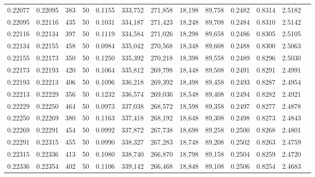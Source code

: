 \begin{tabular}{rrrrrrrrrrrrr}
0.22077 & 0.22095 &   383 &  50 &                                     0.1155 & 333,752 & 271,858 &  18,198 &  89,758 & 0.2482 & 0.8314 & 2.5182 \\
0.22095 & 0.22116 &   435 &  50 &                                     0.1031 & 334,187 & 271,423 &  18,248 &  89,708 & 0.2484 & 0.8310 & 2.5142 \\
0.22116 & 0.22134 &   397 &  50 &                                     0.1119 & 334,584 & 271,026 &  18,298 &  89,658 & 0.2486 & 0.8305 & 2.5105 \\
0.22134 & 0.22155 &   458 &  50 &                                     0.0984 & 335,042 & 270,568 &  18,348 &  89,608 & 0.2488 & 0.8300 & 2.5063 \\
0.22155 & 0.22173 &   350 &  50 &                                     0.1250 & 335,392 & 270,218 &  18,398 &  89,558 & 0.2489 & 0.8296 & 2.5030 \\
0.22173 & 0.22193 &   420 &  50 &                                     0.1064 & 335,812 & 269,798 &  18,448 &  89,508 & 0.2491 & 0.8291 & 2.4991 \\
0.22193 & 0.22213 &   406 &  50 &                                     0.1096 & 336,218 & 269,392 &  18,498 &  89,458 & 0.2493 & 0.8287 & 2.4954 \\
0.22213 & 0.22229 &   356 &  50 &                                     0.1232 & 336,574 & 269,036 &  18,548 &  89,408 & 0.2494 & 0.8282 & 2.4921 \\
0.22229 & 0.22250 &   464 &  50 &                                     0.0973 & 337,038 & 268,572 &  18,598 &  89,358 & 0.2497 & 0.8277 & 2.4878 \\
0.22250 & 0.22269 &   380 &  50 &                                     0.1163 & 337,418 & 268,192 &  18,648 &  89,308 & 0.2498 & 0.8273 & 2.4843 \\
0.22269 & 0.22291 &   454 &  50 &                                     0.0992 & 337,872 & 267,738 &  18,698 &  89,258 & 0.2500 & 0.8268 & 2.4801 \\
0.22291 & 0.22315 &   455 &  50 &                                     0.0990 & 338,327 & 267,283 &  18,748 &  89,208 & 0.2502 & 0.8263 & 2.4759 \\
0.22315 & 0.22336 &   413 &  50 &                                     0.1080 & 338,740 & 266,870 &  18,798 &  89,158 & 0.2504 & 0.8259 & 2.4720 \\
0.22336 & 0.22354 &   402 &  50 &                                     0.1106 & 339,142 & 266,468 &  18,848 &  89,108 & 0.2506 & 0.8254 & 2.4683 \\

\end{tabular}

